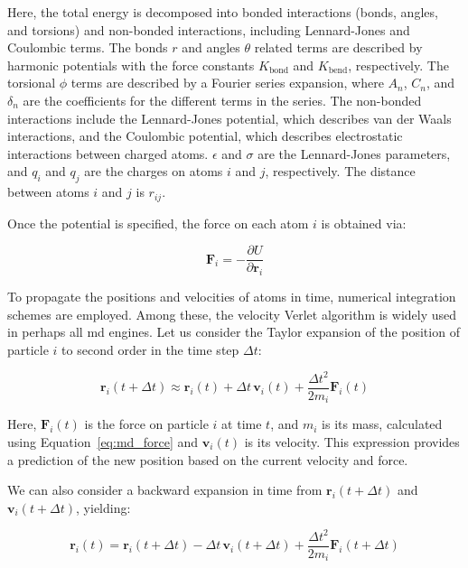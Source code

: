 Here, the total energy is decomposed into bonded interactions (bonds, angles, and torsions) and non-bonded interactions, including Lennard-Jones and Coulombic terms. The bonds $r$ and angles $\theta$ related terms are described by harmonic potentials with the force constants $K_{\text{bond}}$ and $K_{\text{bend}}$, respectively. The torsional $\phi$ terms are described by a Fourier series expansion, where $A_n$, $C_n$, and $\delta_n$ are the coefficients for the different terms in the series. The non-bonded interactions include the Lennard-Jones potential, which describes van der Waals interactions, and the Coulombic potential, which describes electrostatic interactions between charged atoms. $\epsilon$ and $\sigma$ are the Lennard-Jones parameters, and $q_i$ and $q_j$ are the charges on atoms $i$ and $j$, respectively. The distance between atoms $i$ and $j$ is $r_{ij}$.

Once the potential is specified, the force on each atom $i$ is obtained via:

\begin{equation}
    \mathbf{F}_i = -\frac{\partial U}{\partial \mathbf{r}_i}
    \label{eq:md_force}
\end{equation}

To propagate the positions and velocities of atoms in time, numerical integration schemes are employed. Among these, the velocity Verlet algorithm is widely used in perhaps all \ac{md} engines. Let us consider the Taylor expansion of the position of particle $i$ to second order in the time step $\Delta t$:

\begin{equation}
    \mathbf{r}_i(t + \Delta t) \approx \mathbf{r}_i(t) + \Delta t\, \mathbf{v}_i(t) + \frac{\Delta t^2}{2m_i} \mathbf{F}_i(t)
    \label{eq:vv_pos}
\end{equation}

Here, $\mathbf{F}_i(t)$ is the force on particle $i$ at time $t$, and $m_i$ is its mass, calculated using Equation~\ref{eq:md_force} and $\mathbf{v}_i(t)$ is its velocity. This expression provides a prediction of the new position based on the current velocity and force.

We can also consider a backward expansion in time from $\mathbf{r}_i(t + \Delta t)$ and $\mathbf{v}_i(t + \Delta t)$, yielding:

\begin{equation}
    \mathbf{r}_i(t) = \mathbf{r}_i(t + \Delta t) - \Delta t\, \mathbf{v}_i(t + \Delta t) + \frac{\Delta t^2}{2m_i} \mathbf{F}_i(t + \Delta t)
    \label{eq:vv_pos_backward}
\end{equation}

